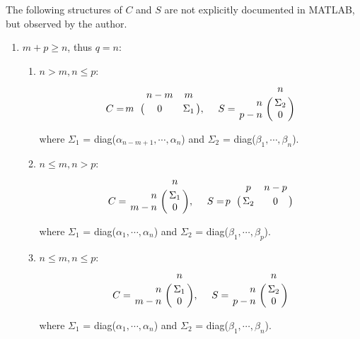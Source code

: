 The following structures of $C$ and $S$ are not explicitly 
documented in MATLAB, but observed by the author.
        \begin{enumerate}
            \item $m + p \geq n$, thus $q = n$:
                \begin{enumerate}
                    \item $n > m, n \leq p$:
                        \begin{displaymath}
                            C = \bordermatrix{ & n-m & m   \cr
                            \hfill m & 0 & \Sigma_1}, \  \ \ \
                            S = \bordermatrix{ & n  \cr
                            \hfill n & \Sigma_2 \cr
                            \hfill p-n & 0 }
                         \end{displaymath}
                         
                        where $\Sigma_1$ = diag($\alpha_{n-m+1}, \cdots, \alpha_{n}$) and $\Sigma_2$ = diag($\beta_1, \cdots, \beta_n$).
                    \item $n \leq m, n > p$:
                        \begin{displaymath}
                            C = \bordermatrix{ & n  \cr
                            \hfill n & \Sigma_1 \cr
                            \hfill m-n & 0 }, \ \ \ \
                            S = \bordermatrix{ & p & n-p   \cr
                            \hfill p & \Sigma_2 & 0}
                        \end{displaymath}
                        
                        where $\Sigma_1$ = diag($\alpha_1, \cdots, \alpha_{n}$) and $\Sigma_2$ = diag($\beta_1, \cdots, \beta_p$).
                    \item $n \leq m, n \leq p$:
                        \begin{displaymath}
                            C = \bordermatrix{ & n  \cr
                            \hfill n & \Sigma_1 \cr
                            \hfill m-n & 0 }, \ \ \ \
                            S = \bordermatrix{ & n  \cr
                            \hfill n & \Sigma_2 \cr
                            \hfill p-n & 0 }
                        \end{displaymath}
                        
                        where $\Sigma_1$ = diag($\alpha_1, \cdots, \alpha_{n}$) and $\Sigma_2$ = diag($\beta_1, \cdots, \beta_n$).
                    

\end{enumerate}
\end{enumerate}
